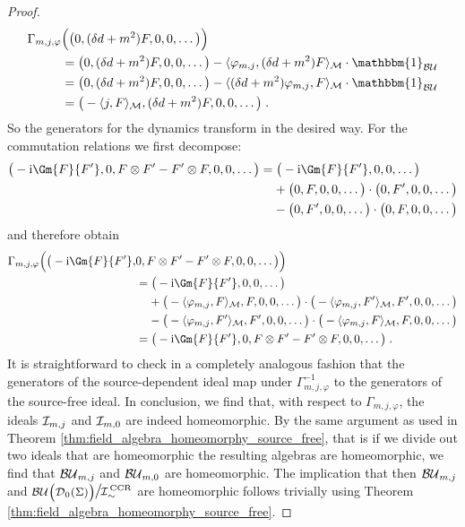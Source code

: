 \begin{proof}
\begin{align}
	\Gamma_{m,j,\varphi}&\Big( \big( 0,(\delta d +m^2)F , 0 , 0 , \dots   \big)  \Big) \notag\\
	&= \big( 0,(\delta d +m^2)F , 0 , 0 , \dots   \big) - \langle \varphi_{m,j}, (\delta d + m^2)F \rangle_\M \cdot \mathbbm{1}_\BU \notag\\
	&= \big( 0,(\delta d +m^2)F , 0 , 0 , \dots   \big) - \langle (\delta d + m^2) \varphi_{m,j}, F \rangle_\M \cdot \mathbbm{1}_\BU \notag\\
	&= \big( - \langle j, F \rangle_\M ,(\delta d +m^2)F , 0 , 0 , \dots   \big)  \formspace.
	\end{align}
	So the generators for the dynamics transform in the desired way. For the commutation relations we first decompose:
	\begin{align}
	\big( -\i \Gm{F}{F'},0 , F \otimes F' - F' \otimes F   , 0 ,0, \dots   \big)  &=\big( -\i \Gm{F}{F'}, 0 ,0, \dots   \big) \\
	&\phantom{M}+ \big( 0,F,0,0,\dots  \big)\cdot \big( 0,F',0,0,\dots  \big)  \notag \\
	&\phantom{M}-\big( 0,F',0,0,\dots  \big)\cdot \big( 0,F,0,0,\dots  \big) \notag
	\end{align}
	and therefore obtain
	\begin{align}
	\Gamma_{m,j,\varphi}\Big( \big( -\i \Gm{F}{F'},&0 , F \otimes F' - F' \otimes F   , 0 ,0, \dots   \big)  \Big) \notag\\
	&=\big( -\i \Gm{F}{F'}, 0 ,0, \dots   \big)  \notag \\
	&\phantom{M}+ \big( - \langle \varphi_{m,j},F \rangle_\M,F,0,0,\dots  \big)\cdot \big( - \langle \varphi_{m,j},F' \rangle_\M,F',0,0,\dots  \big)  \notag \\
	&\phantom{M}-\big( - \langle \varphi_{m,j},F' \rangle_\M,F',0,0,\dots  \big)\cdot \big( - \langle \varphi_{m,j},F \rangle_\M,F,0,0,\dots  \big) \notag\\
	&= \big( -\i \Gm{F}{F'},0 , F \otimes F' - F' \otimes F   , 0 ,0, \dots   \big)   \formspace.
	\end{align}
	It is straightforward to check in a completely analogous fashion that the generators of the source-dependent ideal map under $\Gamma_{m,j,\varphi}^{-1}$ to the generators of the source-free ideal.
	In conclusion, we find that, with respect to $\Gamma_{m,j,\varphi}$, the ideals $\mathcal{I}_{m,j}$ and $\mathcal{I}_{m,0}$ are indeed homeomorphic. By the same argument as used in Theorem \ref{thm:field_algebra_homeomorphy_source_free}, that is if we divide out two ideals that are homeomorphic the resulting algebras are homeomorphic, we find that ${\mathcal{BU}_{m,j}}$ and $\mathcal{BU}_{m,0}$ are homeomorphic. The implication that then ${\mathcal{BU}_{m,j}}$ and ${\Quotientscale{\BU\big(\Dzs\big)}{\ICCR}}$ are homeomorphic follows trivially using Theorem \ref{thm:field_algebra_homeomorphy_source_free}.
\end{proof}
